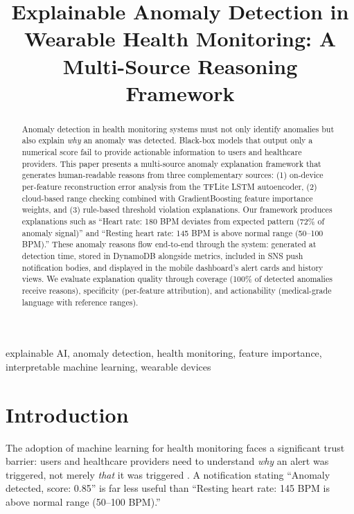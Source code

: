 \documentclass[conference]{IEEEtran}
\begin{document}
\title{Explainable Anomaly Detection in Wearable Health Monitoring: A Multi-Source Reasoning Framework}

\author{
}

\maketitle

\begin{abstract}
Anomaly detection in health monitoring systems must not only identify anomalies but also explain \textit{why} an anomaly was detected. Black-box models that output only a numerical score fail to provide actionable information to users and healthcare providers. This paper presents a multi-source anomaly explanation framework that generates human-readable reasons from three complementary sources: (1) on-device per-feature reconstruction error analysis from the TFLite LSTM autoencoder, (2) cloud-based range checking combined with GradientBoosting feature importance weights, and (3) rule-based threshold violation explanations. Our framework produces explanations such as ``Heart rate: 180 BPM deviates from expected pattern (72\% of anomaly signal)'' and ``Resting heart rate: 145 BPM is above normal range (50--100 BPM).'' These anomaly reasons flow end-to-end through the system: generated at detection time, stored in DynamoDB alongside metrics, included in SNS push notification bodies, and displayed in the mobile dashboard's alert cards and history views. We evaluate explanation quality through coverage (100\% of detected anomalies receive reasons), specificity (per-feature attribution), and actionability (medical-grade language with reference ranges).
\end{abstract}

\begin{IEEEkeywords}
explainable AI, anomaly detection, health monitoring, feature importance, interpretable machine learning, wearable devices
\end{IEEEkeywords}

\section{Introduction}
The adoption of machine learning for health monitoring faces a significant trust barrier: users and healthcare providers need to understand \textit{why} an alert was triggered, not merely \textit{that} it was triggered \cite{xai1}. A notification stating ``Anomaly detected, score: 0.85'' is far less useful than ``Resting heart rate: 145 BPM is above normal range (50--100 BPM).''
\end{document}
